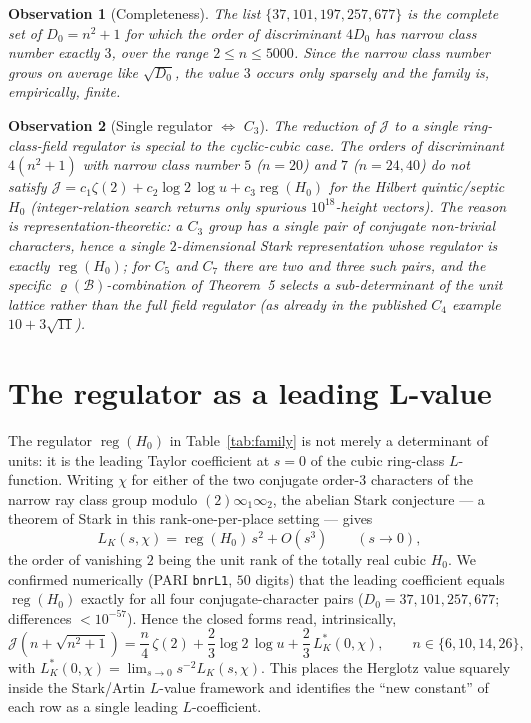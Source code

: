 \documentclass[11pt]{article}
\newtheorem{observation}{Observation}
\newcommand{\Jc}{\mathcal{J}}
\newcommand{\reg}{\operatorname{reg}}
\newcommand{\rhoB}{\varrho}
\begin{document}
\begin{observation}[Completeness]
The list $\{37,101,197,257,677\}$ is the \emph{complete} set of $D_0=n^2+1$ for
which the order of discriminant $4D_0$ has narrow class number exactly $3$, over
the range $2\le n\le5000$. Since the narrow class number grows on average like
$\sqrt{D_0}$, the value $3$ occurs only sparsely and the family is, empirically,
finite.
\end{observation}

\begin{observation}[Single regulator $\iff$ $C_3$]
The reduction of $\Jc$ to a \emph{single} ring-class-field regulator is special
to the cyclic-cubic case. The orders of discriminant $4(n^2+1)$ with narrow class
number $5$ ($n=20$) and $7$ ($n=24,40$) do \emph{not} satisfy
$\Jc=c_1\zeta(2)+c_2\log2\,\log u+c_3\reg(H_0)$ for the Hilbert quintic/septic
$H_0$ (integer-relation search returns only spurious $10^{18}$-height vectors).
The reason is representation-theoretic: a $C_3$ group has a single pair of
conjugate non-trivial characters, hence a single $2$-dimensional Stark
representation whose regulator is exactly $\reg(H_0)$; for $C_5$ and $C_7$ there
are two and three such pairs, and the specific $\rhoB(\mathcal B)$-combination of
Theorem~5 selects a sub-determinant of the unit lattice rather than the full
field regulator (as already in the published $C_4$ example $10+3\sqrt{11}$).
\end{observation}

\section{The regulator as a leading L-value}

The regulator $\reg(H_0)$ in Table~\ref{tab:family} is not merely a determinant of
units: it is the leading Taylor coefficient at $s=0$ of the cubic ring-class
$L$-function. Writing $\chi$ for either of the two conjugate order-$3$ characters
of the narrow ray class group modulo $(2)\infty_1\infty_2$, the abelian Stark
conjecture --- a theorem of Stark in this rank-one-per-place setting --- gives
\[
  L_K(s,\chi)=\reg(H_0)\,s^2+O(s^3)\qquad(s\to0),
\]
the order of vanishing $2$ being the unit rank of the totally real cubic $H_0$.
We confirmed numerically (PARI \texttt{bnrL1}, $50$ digits) that the leading
coefficient equals $\reg(H_0)$ exactly for all four conjugate-character pairs
($D_0=37,101,257,677$; differences $<10^{-57}$). Hence the closed forms read,
intrinsically,
\[
  \Jc(n+\sqrt{n^2+1})=\frac n4\,\zeta(2)+\frac23\log2\,\log u
     +\frac23\,L_K^{*}(0,\chi),\qquad n\in\{6,10,14,26\},
\]
with $L_K^{*}(0,\chi)=\lim_{s\to0}s^{-2}L_K(s,\chi)$. This places the Herglotz
value squarely inside the Stark/Artin $L$-value framework and identifies the
``new constant'' of each row as a single leading $L$-coefficient.
\end{document}
